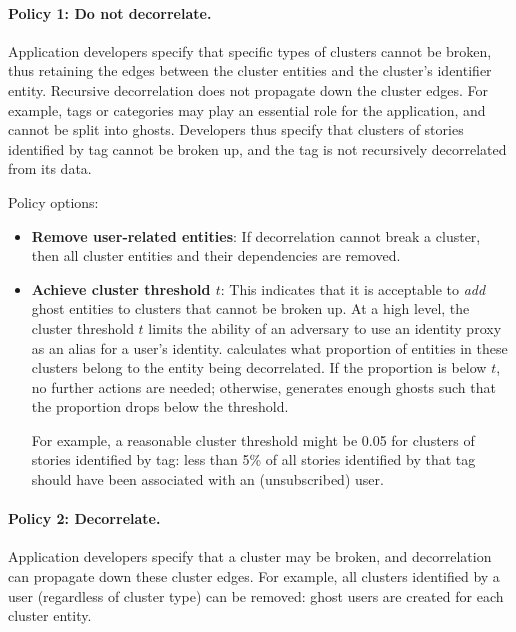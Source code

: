 \paragraph{Policy 1: Do not decorrelate.}

Application developers specify that specific types of clusters cannot be broken, thus retaining the edges between the cluster entities and the cluster's identifier entity.
Recursive decorrelation does not propagate down the cluster edges. 
For example, tags or categories may play an essential role
for the application, and cannot be split into ghosts. Developers thus specify that clusters of stories 
identified by tag cannot be broken up, and the tag is not recursively decorrelated from its data.

\vspace{12pt}
\noindent Policy options:
\begin{itemize}
    \item \textbf{Remove user-related entities}: If decorrelation cannot break a cluster, then all
        cluster entities and their dependencies are removed.

    \item \textbf{Achieve cluster threshold $t$}: This indicates that it is acceptable to \emph{add}
        ghost entities to clusters that cannot be broken up.  At a high level, the cluster threshold
        $t$ limits the ability of an adversary to use an identity proxy as an alias for a user's
        identity.  \sys{} calculates what proportion of entities in these clusters belong to the
        entity being decorrelated. If the proportion is below $t$, no further actions are needed;
        otherwise, \sys{} generates enough ghosts such that the proportion drops below the
        threshold. 

        For example, a reasonable cluster threshold might be 0.05 for clusters of stories identified by
        tag: less than 5\% of all stories identified by that tag should have been associated with an
        (unsubscribed) user. 
\end{itemize}

\paragraph{Policy 2: Decorrelate.}

Application developers specify that a cluster may be broken, and decorrelation can propagate down
these cluster edges.
For example, all clusters identified by a user (regardless of cluster type) can be removed: ghost
users are created for each cluster entity.

